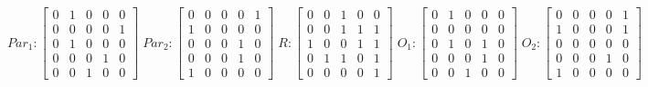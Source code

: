      $$
        Par_{1} : \begin{bmatrix}
            0 & 1 & 0 & 0 & 0 \\
            0 & 0 & 0 & 0 & 1 \\
            0 & 1 & 0 & 0 & 0 \\
			0 & 0 & 0 & 1 & 0 \\
            0 & 0 & 1 & 0 & 0 
        \end{bmatrix}
        \;
        Par_{2} : \begin{bmatrix}
            0 & 0 & 0 & 0 & 1 \\
            1 & 0 & 0 & 0 & 0 \\
            0 & 0 & 0 & 1 & 0 \\
            0 & 0 & 0 & 1 & 0 \\
            1 & 0 & 0 & 0 & 0
        \end{bmatrix}
        \;
        R : \begin{bmatrix}
            0 & 0 & 1 & 0 & 0 \\
            0 & 0 & 1 & 1 & 1 \\
            1 & 0 & 0 & 1 & 1 \\
            0 & 1 & 1 & 0 & 1 \\
            0 & 0 & 0 & 0 & 1
        \end{bmatrix}
        \;
        O_{1} : \begin{bmatrix}
            0 & 1 & 0 & 0 & 0 \\
            0 & 0 & 0 & 0 & 0 \\
            0 & 1 & 0 & 1 & 0 \\
            0 & 0 & 0 & 1 & 0 \\
            0 & 0 & 1 & 0 & 0
        \end{bmatrix}
        \;
        O_{2} : \begin{bmatrix}
            0 & 0 & 0 & 0 & 1 \\
            1 & 0 & 0 & 0 & 1 \\
            0 & 0 & 0 & 0 & 0 \\
            0 & 0 & 0 & 1 & 0 \\
            1 & 0 & 0 & 0 & 0
        \end{bmatrix}
    $$ 
